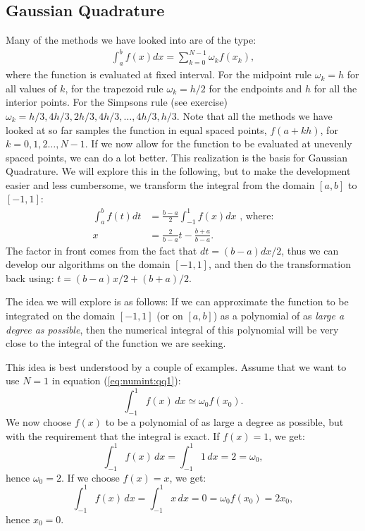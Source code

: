 \documentclass[graybox,sectrefs,envcountresetchap,open=right,final]{svmonodo}
\newenvironment{graybox2admon}[1][]{
\begin{graybox2mdframed}[frametitle=#1]
}
{
\end{graybox2mdframed}
}
\begin{document}
\subsection{Gaussian Quadrature}
Many of the methods we have looked into are of the type:
\begin{align}
	\int_a^b f(x) dx = \sum_{k=0}^{N-1} \omega_k f(x_k),\label{eq:numint:qq1}
\end{align}
where the function is evaluated at fixed interval. For the midpoint rule $\omega_k=h$ for all values of $k$, for the trapezoid rule 
$\omega_k=h/2$ for the endpoints and $h$ for all the interior points. 
For the Simpsons rule (see exercise) $\omega_k=h/3, 4h/3,2h/3,4h/3,\ldots,4h/3,h/3$. 
Note that all the methods we have looked at so far samples the function in equal spaced points, $f(a+k h)$, 
for $k=0, 1, 2\ldots, N-1$. If we now allow for the function to be evaluated at unevenly spaced points, we can do a lot better. 
This realization is the basis for Gaussian Quadrature. We will explore this in the following, 
but to make the development easier and less cumbersome, we transform the integral from the domain $[a,b]$ to $[-1,1]$:
\begin{align}
\int_a^bf(t)dt&=\frac{b-a}{2}\int_{-1}^{1}f(x)dx\text{ , where:}\\ 
x&=\frac{2}{b-a}t-\frac{b+a}{b-a}.
\end{align}
The factor in front comes from the fact that $dt=(b-a)dx/2$, thus we can develop our algorithms on the domain $[-1,1]$, 
and then do the transformation back using: $t=(b-a)x/2+(b+a)/2$.



\begin{graybox2admon}[Notice]
The idea we will explore is as follows:
If we can approximate the function to be integrated on the domain $[-1,1]$ (or on $[a,b]$) as a 
polynomial of as \emph{large a degree as possible}, then the numerical integral of this polynomial will be very close to the integral of the 
function we are seeking.
\end{graybox2admon}



This idea is best understood by a couple of examples. Assume that we want to use $N=1$ in equation (\ref{eq:numint:qq1}):
\begin{equation}
\int_{-1}^{1}f(x)\,dx\simeq\omega_0f(x_0).
\end{equation}
We now choose $f(x)$ to be a polynomial of as large a degree as possible, but with the requirement that the integral is exact. If $f(x)=1$, we get:
\begin{equation}
\int_{-1}^{1}f(x)\,dx=\int_{-1}^{1}1\,dx=2=\omega_0,
\end{equation}
hence $\omega_0=2$. If we choose $f(x)=x$, we get:
\begin{equation}
\int_{-1}^{1}f(x)\,dx=\int_{-1}^{1}x\,dx=0=\omega_0f(x_0)=2x_0,
\end{equation}
hence $x_0=0$. 
\end{document}
